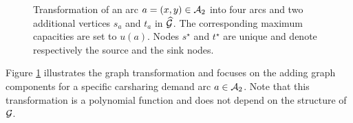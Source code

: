 \begin{figure}[t]
\centering

\caption[An arc transformation.]{Transformation of an arc $a = (x,y) \in \mathcal{A}_2$ into four arcs and two additional vertices $s_a$ and $t_a$  in $\widehat{\cal G}$. The corresponding maximum capacities are set to $u(a)$. Nodes $s^\star$ and $t^\star$ are unique and denote respectively the source and the sink nodes.}
\label{fig:tegTransformationPoly}
\end{figure}

Figure \ref{fig:tegTransformationPoly} illustrates the graph transformation and focuses on the adding graph components for a specific carsharing demand arc $a \in \mathcal{A}_2$.
Note that this transformation is a polynomial function and does not depend on the structure of $\mathcal{G}$.


